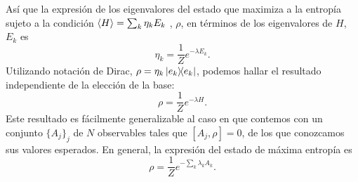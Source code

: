 Así que la expresión de los eigenvalores del estado que maximiza a la entropía sujeto a la condición $\expval{H}=\sum_{k}\eta_{k}E_{k}$ , $\rho$, en términos de los eigenvalores de $H$, $E_{k}$ es
\begin{equation}
    \eta_{k}=\frac{1}{Z}e^{-\lambda E_{k}}.\nonumber
\end{equation}
Utilizando notación de Dirac, $\rho=\eta_{k}\dyad{e_{k}}$, podemos hallar el resultado independiente de la elección de la base:
\begin{equation}
    \rho=\frac{1}{Z}e^{-\lambda H}.
\end{equation}
Este resultado es fácilmente generalizable al caso en que contemos con un  conjunto $\{A_{j}\}_{j}$ de $N$ observables tales que $[A_{j},\rho]=0$,\ddnote{,} de los que conozcamos sus valores esperados. En general, la expresión del estado de máxima entropía es
\begin{equation}\label{eq:GeneralMaxEnt}
    \rho=\frac{1}{Z}e^{-\sum_{k}\lambda_{k} A_{k}}.
\end{equation}
